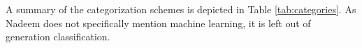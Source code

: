 
A summary of the categorization schemes is depicted in Table \ref{tab:categories}. As Nadeem \cite{nadeem_ashraf_forensic_2013} does not specifically mention machine learning, it is left out of generation classification.


